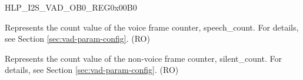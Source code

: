 \begin{register}{H}{LP\_I2S\_VAD\_OB0\_REG}{0x00B0}\label{regdesc:LPI2SVADOB0REG}
%
%
%
\regnewline%
\begin{regdesc}\begin{reglist}
\label{fielddesc:LPI2SSPEECHCOUNTOB}\item [LP\_I2S\_SPEECH\_COUNT\_OB] Represents the count value of the voice frame counter, speech\_count. For details, see Section \ref{sec:vad-param-config}. (RO)
\label{fielddesc:LPI2SSILENTCOUNTOB}\item [LP\_I2S\_SILENT\_COUNT\_OB] Represents the count value of the non-voice frame counter, silent\_count. For details, see Section \ref{sec:vad-param-config}. (RO)
\end{reglist}\end{regdesc}
\end{register}

